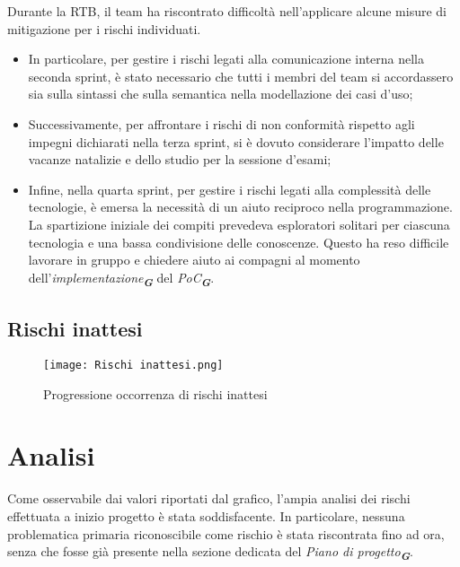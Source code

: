 Durante la RTB, il team ha riscontrato difficoltà nell'applicare alcune misure di mitigazione
per i rischi individuati.\\
\begin{itemize}
    \item In particolare, per gestire i rischi legati alla comunicazione interna nella seconda sprint, è stato necessario che 
    tutti i membri del team si accordassero sia sulla sintassi che sulla semantica nella modellazione dei casi d'uso;
    \item Successivamente, per affrontare i rischi di non conformità rispetto agli impegni dichiarati nella terza sprint, si è 
    dovuto considerare l'impatto delle vacanze natalizie e dello studio per la sessione d'esami;
    \item Infine, nella quarta sprint, per gestire i rischi legati alla complessità delle tecnologie, è emersa la necessità di 
    un aiuto reciproco nella programmazione. La spartizione iniziale dei compiti prevedeva esploratori solitari per ciascuna 
    tecnologia e una bassa condivisione delle conoscenze. Questo ha reso difficile lavorare in gruppo e chiedere aiuto ai compagni 
    al momento dell'\emph{implementazione}\textsubscript{\textbf{\textit{G}}} del \emph{PoC}\textsubscript{\textbf{\textit{G}}}.

\end{itemize}

\newpage

\subsection{Rischi inattesi}
\label{subsec:Rischi inattesi}

\begin{figure}[h] 
    \centering
    \texttt{[image: Rischi inattesi.png]}
    \caption{Progressione occorrenza di rischi inattesi} 
    \label{fig: Rischi inattesi}
\end{figure}

\section*{Analisi}

Come osservabile dai valori riportati dal grafico, l’ampia analisi dei rischi effettuata a
inizio progetto è stata soddisfacente. In particolare, nessuna problematica primaria
riconoscibile come rischio è stata riscontrata fino ad ora, senza che fosse già presente
nella sezione dedicata del \emph{Piano di progetto}\textsubscript{\textbf{\textit{G}}}.

